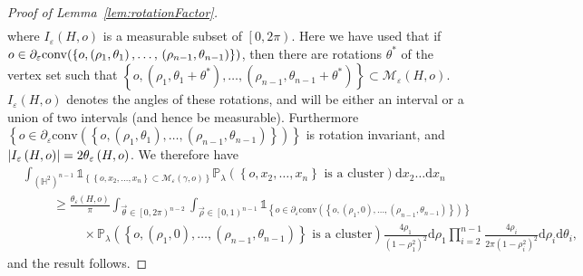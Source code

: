 \documentclass[10pt,a4paper,dvipsnames]{article}
\theoremstyle{definition}
\theoremstyle{remark}
\newcommand{\pla}{\mathbb P_\lambda}
\newcommand{\Mcal}{\mathcal{M}}
\newcommand{\HypTwo}{{\mathbb{H}^2}}
\newcommand{\dd}{\mathrm{d}} %
\newcommand{\convex}[1]{{\mathrm{conv}\left(#1\right)}}
\newcommand{\Id}{\mathds 1}
\DeclarePairedDelimiter\abs{\lvert}{\rvert}
\newcommand{\orig}{o}
\numberwithin{equation}{section}
\begin{document}
\begin{proof}[Proof of Lemma~\ref{lem:rotationFactor}]
\begin{align}
    \end{align}
    where $I_\varepsilon\left(H,\orig\right)$ is a measurable subset of $\left[0,2\pi\right)$. Here we have used that if $\orig\in\partial_{\varepsilon}\mathrm{conv}(\{\orig,\left(\rho_1,\theta_1\right),\ldots,\\\left(\rho_{n-1},\theta_{n-1}\right)\})$, then there are rotations $\theta^*$ of the vertex set such that $\left\{\orig,\left(\rho_1,\theta_{1}+\theta^*\right),\ldots,\left(\rho_{n-1},\theta_{n-1}+\theta^*\right)\right\}\subset\Mcal_\varepsilon\left(H,\orig\right)$. $I_\varepsilon\left(H,\orig\right)$ denotes the angles of these rotations, and will be either an interval or a union of two intervals (and hence be measurable). Furthermore $\left\{\orig\in\partial_{\varepsilon}\convex{\left\{\orig,\left(\rho_1,\theta_1\right),\ldots,\left(\rho_{n-1},\theta_{n-1}\right)\right\}}\right\}$ is rotation invariant, and $\abs*{I_\varepsilon\left(H,\orig\right)}= 2\theta_\varepsilon\left(H,\orig\right)$. We therefore have
    \begin{align}
        &\int_{\left(\HypTwo\right)^{n-1}}\Id_{\left\{\left\{\orig,x_2,\ldots,x_n\right\}\subset\Mcal_\varepsilon\left(\gamma,\orig\right)\right\}}\pla\left(\left\{\orig,x_2,\ldots,x_n\right\}\text{ is a cluster}\right)\dd x_2\ldots \dd x_n\nonumber\\
        &\hspace{1cm}\geq \frac{\theta_\varepsilon\left(H,\orig\right)}{\pi}\int_{\vec{\theta}\in\left[0,2\pi\right)^{n-2}}\int_{\vec{\rho}\in\left[0,1\right)^{n-1}} \Id_{\left\{\orig\in\partial_{\varepsilon}\convex{\left\{\orig,\left(\rho_1,0\right),\ldots,\left(\rho_{n-1},\theta_{n-1}\right)\right\}}\right\}}\nonumber\\
        &\hspace{2cm}\times\pla\left(\left\{\orig,\left(\rho_1,0\right),\ldots,\left(\rho_{n-1},\theta_{n-1}\right)\right\}\text{ is a cluster}\right)\frac{4\rho_1}{\left(1-\rho_1^2\right)^2}\dd\rho_1\prod^{n-1}_{i=2}\frac{4\rho_i}{2\pi\left(1-\rho_i^2\right)^2}\dd \rho_i\dd\theta_i,
    \end{align}
    and the result follows.
\end{proof}
\end{document}
